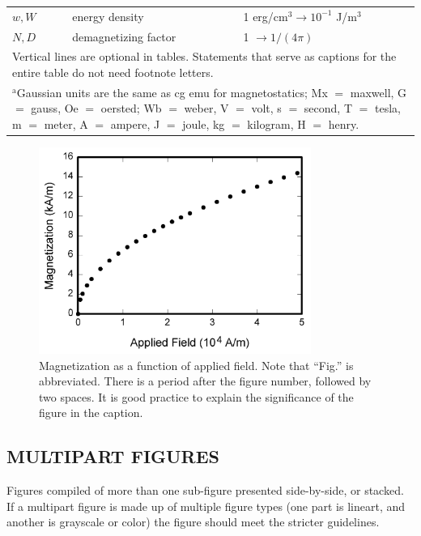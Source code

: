 \documentclass{IEEEoj}
\begin{document}
\begin{table}
\begin{tabular}{|p{25pt}|p{75pt}|p{115pt}|}
$w, W$& 
energy density& 
1 erg/cm$^{3} \to  10^{-1}$ J/m$^{3}$ \\
$N, D$& 
demagnetizing factor& 
1 $\to  1/(4\pi )$ \\
\hline
\multicolumn{3}{p{251pt}}{Vertical lines are optional in tables. Statements that serve as captions for 
the entire table do not need footnote letters. }\\
\multicolumn{3}{p{251pt}}{$^{\mathrm{a}}$Gaussian units are the same as cg emu for magnetostatics; Mx 
$=$ maxwell, G $=$ gauss, Oe $=$ oersted; Wb $=$ weber, V $=$ volt, s $=$ 
second, T $=$ tesla, m $=$ meter, A $=$ ampere, J $=$ joule, kg $=$ 
kilogram, H $=$ henry.}
\end{tabular}
\label{tab1}
\end{table}

\begin{figure}
\centerline{\includegraphics[width=3.5in]{fig1}}
\caption{Magnetization as a function of applied field. Note that ``Fig.'' 
is abbreviated. There is a period after the figure number, followed by two 
spaces. It is good practice to explain the significance of the figure in the 
caption.\label{fig1}}
\end{figure}

\subsection{MULTIPART FIGURES}
Figures compiled of more than one sub-figure presented side-by-side, or 
stacked. If a multipart figure is made up of multiple figure types (one part 
is lineart, and another is grayscale or color) the figure should meet the 
stricter guidelines.
\end{document}
